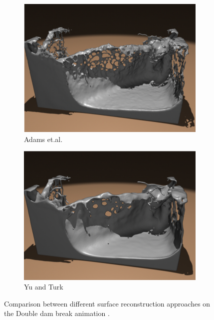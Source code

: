 \begin{figure}[H]
	\begin{center}
		\begin{subfigure}[b]{0.48\textwidth}
			\includegraphics[width=\textwidth]{figures/Adams.et.al.Reconstruction.png}
			\caption{Adams et.al.}
		\end{subfigure}
		\begin{subfigure}[b]{0.48\textwidth}
			\includegraphics[width=\textwidth]{figures/Ya_and_Turl.Reconstruction.png}
			\caption{Yu and Turk}
		\end{subfigure}
	\end{center}
	\caption{Comparison between different surface reconstruction approaches on the Double dam break animation \cite{YuTurk}.}
	\label{fig:Adams_vs_YoTurk}
\end{figure}


        
        
        

